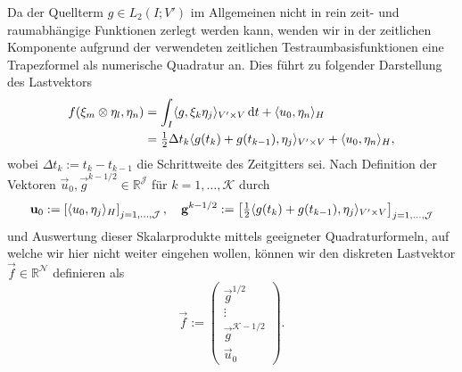\documentclass[../main.tex]{subfiles}
\begin{document}
Da der Quellterm $g \in L_{2}(I; V')$ im Allgemeinen nicht in rein zeit- und raumabhängige Funktionen zerlegt werden kann, wenden wir in der zeitlichen Komponente aufgrund der verwendeten zeitlichen Testraumbasisfunktionen eine Trapezformel als numerische Quadratur an.
Dies führt zu folgender Darstellung des Lastvektors
\begin{align}
    f(\xi_{m} \otimes \eta_{l}, \eta_{n})
    &= \int_{I} \langle g,\xi_{k} \eta_{j}\rangle_{V' \times V} \mathop{}\!\mathrm{d} t + \langle u_{0},\eta_{n}\rangle_{H}
    \\&= \tfrac{1}{2} \Delta t_{k} \langle g(t_{k}) + g(t_{k - 1}),\eta_{j}\rangle_{V' \times V}
         + \langle u_{0},\eta_{n}\rangle_{H},
\end{align}
wobei $\Delta t_{k} := t_{k} - t_{k - 1}$ die Schrittweite des Zeitgitters sei.
Nach Definition der Vektoren $\vec{u}_{0}, \vec{g}^{k - 1/2} \in \mathbb{R}^{\mathcal J}$ für $k = 1, \dots, \mathcal K$ durch
\begin{equation}
    \mathbf{u}_{0} := \left[ \langle u_{0},\eta_{j}\rangle_{H} \right]_{j = 1, \dots, \mathcal J },
    \quad
    \mathbf{g}^{k - 1/2} := \left[ \tfrac{1}{2} \langle g(t_{k}) + g(t_{k - 1}),\eta_{j}\rangle_{V' \times V}  \right]_{j = 1, \dots, \mathcal J}
\end{equation}
und Auswertung dieser Skalarprodukte mittels geeigneter Quadraturformeln, auf welche wir hier nicht weiter eingehen wollen, können wir den diskreten Lastvektor $\vec{f} \in \mathbb{R}^{\mathcal N}$ definieren als
\begin{equation}
    \vec{f} := \begin{pmatrix}
        \vec{g}^{1/2} \\
        \vdots\\
        \vec{g}^{\mathcal K - 1/2}\\
        \vec{u}_{0}
    \end{pmatrix}.
\end{equation}
\end{document}
